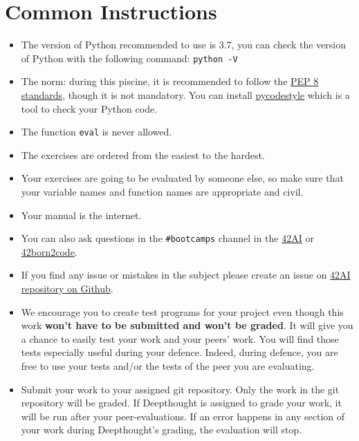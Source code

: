 
\chapter{Common Instructions}
\begin{itemize}
  \item The version of Python recommended to use is 3.7, you can
  check the version of Python with the following command: \texttt{python -V}
  
  \item The norm: during this piscine, it is recommended to follow the
  \href{https://www.python.org/dev/peps/pep-0008/}{PEP 8 standards}, though it is not mandatory.
  You can install \href{https://pypi.org/project/pycodestyle}{pycodestyle} which
  is a tool to check your Python code.
  
  \item The function \texttt{eval} is never allowed.
  
  \item The exercises are ordered from the easiest to the hardest.
  
  \item Your exercises are going to be evaluated by someone else,
  so make sure that your variable names and function names are appropriate and civil.
  
  \item Your manual is the internet.
  
  \item You can also ask questions in the \texttt{\#bootcamps} channel in the \href{https://42-ai.slack.com}{42AI}
  or \href{42born2code.slack.com}{42born2code}.
  
  \item If you find any issue or mistakes in the subject please create an issue on \href{https://github.com/42-AI/bootcamp_python/issues}{42AI repository on Github}.
  
  \item We encourage you to create test programs for your
  project even though this work \textbf{won't have to be
  submitted and won't be graded}. It will give you a chance
  to easily test your work and your peers’ work. You will find
  those tests especially useful during your defence. Indeed,
  during defence, you are free to use your tests and/or the
  tests of the peer you are evaluating.
  
  \item Submit your work to your assigned git repository. Only the work in the
  git repository will be graded. If Deepthought is assigned to grade your
  work, it will be run after your peer-evaluations.
  If an error happens in any section of your work during Deepthought's grading,
  the evaluation will stop.
\end{itemize}